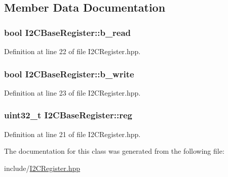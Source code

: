 \subsection{Member Data Documentation}
\subsubsection[{\texorpdfstring{b\+\_\+read}{b_read}}]{\setlength{\rightskip}{0pt plus 5cm}bool I2\+C\+Base\+Register\+::b\+\_\+read\hspace{0.3cm}{\ttfamily [protected]}}\hypertarget{class_i2_c_base_register_a2e8f180fa393df31a1418d6f9cc55a1a}{}\label{class_i2_c_base_register_a2e8f180fa393df31a1418d6f9cc55a1a}


Definition at line 22 of file I2\+C\+Register.\+hpp.

\subsubsection[{\texorpdfstring{b\+\_\+write}{b_write}}]{\setlength{\rightskip}{0pt plus 5cm}bool I2\+C\+Base\+Register\+::b\+\_\+write\hspace{0.3cm}{\ttfamily [protected]}}\hypertarget{class_i2_c_base_register_ae0691af94ba363130da18520310a8c09}{}\label{class_i2_c_base_register_ae0691af94ba363130da18520310a8c09}


Definition at line 23 of file I2\+C\+Register.\+hpp.

\subsubsection[{\texorpdfstring{reg}{reg}}]{\setlength{\rightskip}{0pt plus 5cm}uint32\+\_\+t I2\+C\+Base\+Register\+::reg\hspace{0.3cm}{\ttfamily [protected]}}\hypertarget{class_i2_c_base_register_a5ec30e59be3ce0626848c665dbea8047}{}\label{class_i2_c_base_register_a5ec30e59be3ce0626848c665dbea8047}


Definition at line 21 of file I2\+C\+Register.\+hpp.



The documentation for this class was generated from the following file\+:\begin{DoxyCompactItemize}
\item 
include/\hyperlink{_i2_c_register_8hpp}{I2\+C\+Register.\+hpp}\end{DoxyCompactItemize}
